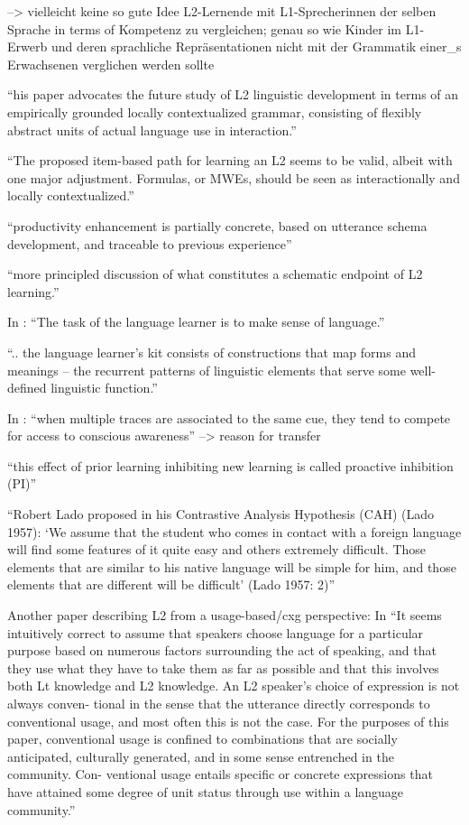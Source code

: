 --> vielleicht keine so gute Idee L2-Lernende mit L1-Sprecherinnen der selben Sprache in terms of Kompetenz zu vergleichen; genau so wie Kinder im L1-Erwerb und deren sprachliche Repräsentationen nicht mit der Grammatik einer\_s Erwachsenen verglichen werden sollte

``his paper advocates the future study of L2 linguistic
development in terms of an empirically grounded locally contextualized
grammar, consisting of flexibly abstract units of actual language use in
interaction.''

``The proposed item-based path for learning an L2 seems to be valid, albeit
with one major adjustment. Formulas, or MWEs, should be seen as
interactionally and locally contextualized.''

``productivity enhancement is partially concrete, based on utterance schema
development, and traceable to previous experience''

``more principled discussion of what constitutes a schematic endpoint of L2 learning.''

In \cite{Ellis04}: ``The task of the language learner is to make sense of language.''

``.. the language learner's kit consists of constructions that map forms and meanings -- the recurrent patterns of linguistic elements that serve some well-defined linguistic function.''

In \cite{Ellis06}: ``when multiple
traces are associated to the same cue, they tend to compete for access to
conscious awareness'' --> reason for transfer

``this effect of prior learning inhibiting
new learning is called proactive inhibition (PI)''

``Robert Lado proposed in his
Contrastive Analysis Hypothesis (CAH) (Lado 1957): ‘We assume that the
student who comes in contact with a foreign language will find some features
of it quite easy and others extremely difficult. Those elements that are similar
to his native language will be simple for him, and those elements that
are different will be difficult’ (Lado 1957: 2)''

Another paper describing L2 from a usage-based/cxg perspective:
In \cite{}
``It seems intuitively correct to assume
that speakers choose language for a particular purpose based on numerous
factors surrounding the act of speaking, and that they use what they have to
take them as far as possible and that this involves both Lt knowledge and
L2 knowledge. An L2 speaker's choice of expression is not always conven-
tional in the sense that the utterance directly corresponds to conventional
usage, and most often this is not the case. For the purposes of this paper,
conventional usage is confined to combinations that are socially anticipated,
culturally generated, and in some sense entrenched in the community. Con-
ventional usage entails specific or concrete expressions that have attained
some degree of unit status through use within a language community.''


